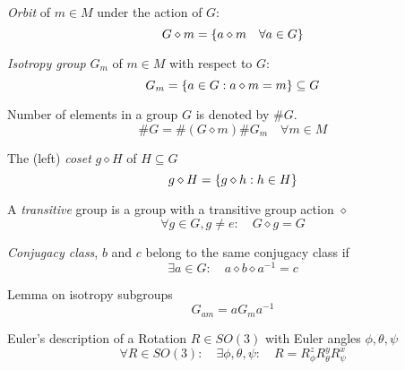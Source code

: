 			\noindent
			\emph{Orbit} of $m\in M$ under the action of $G$:
			\begin{equation}
				G \diamond m = \qty{ a\diamond m \quad \forall a \in G}
			\end{equation}

			\noindent
			\emph{Isotropy group} $G_m$ of $m\in M$ with respect to $G$:
			\begin{equation}
				G_m = \qty{a\in G: a\diamond m = m} \subseteq{G}
			\end{equation}			
			
			\noindent
			Number of elements in a group $G$ is denoted by $\# G$.
			\begin{equation}
				\# G = \#(G \diamond m) \#G_m \quad \forall m \in M
			\end{equation}

			\noindent
			The (left) \emph{coset} $g \diamond H$ of $H \subseteq G$
			\begin{equation}
				g \diamond H = \qty{g\diamond h: h\in H} 
			\end{equation}

			\noindent
			A \emph{transitive} group is a group with a transitive group action $\diamond$
			\begin{equation}
				\forall g \in G, g \ne e: \quad G \diamond g = G
			\end{equation}

			\noindent
			\emph{Conjugacy class}, $b$ and $c$ belong to the same conjugacy class if
			\begin{equation}
				\exists a \in G: \quad a \diamond b \diamond a^{-1} = c
			\end{equation}

			\noindent
			Lemma on isotropy subgroups
			\begin{equation}
				G_{a m} = a G_{m} a^{-1}
			\end{equation}
			
			\noindent
			Euler's description of a Rotation $R\in SO(3)$ with Euler angles $\phi, \theta, \psi$
			\begin{equation}
				\forall R \in SO(3):\quad \exists \phi, \theta, \psi:\quad R = R_\phi^z R_\theta^y R_\psi^x
			\end{equation}
			
